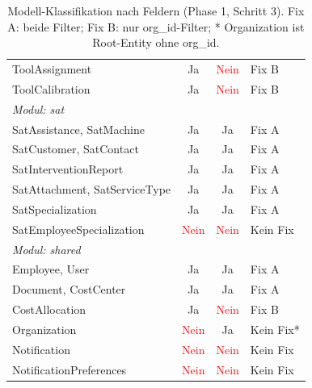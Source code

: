 \begin{table}[H]
\begin{center}
\begin{tabular}{|l|c|c|l|}
            ToolAssignment                & \textcolor{green!60!black}{Ja} & \textcolor{red}{Nein}          & Fix B              \\
            ToolCalibration               & \textcolor{green!60!black}{Ja} & \textcolor{red}{Nein}          & Fix B              \\
            \hline
            \multicolumn{4}{|l|}{\textit{Modul: sat}}                                                                            \\
            \hline
            SatAssistance, SatMachine     & \textcolor{green!60!black}{Ja} & \textcolor{green!60!black}{Ja} & Fix A              \\
            SatCustomer, SatContact       & \textcolor{green!60!black}{Ja} & \textcolor{green!60!black}{Ja} & Fix A              \\
            SatInterventionReport         & \textcolor{green!60!black}{Ja} & \textcolor{green!60!black}{Ja} & Fix A              \\
            SatAttachment, SatServiceType & \textcolor{green!60!black}{Ja} & \textcolor{green!60!black}{Ja} & Fix A              \\
            SatSpecialization             & \textcolor{green!60!black}{Ja} & \textcolor{green!60!black}{Ja} & Fix A              \\
            SatEmployeeSpecialization     & \textcolor{red}{Nein}          & \textcolor{red}{Nein}          & Kein Fix           \\
            \hline
            \multicolumn{4}{|l|}{\textit{Modul: shared}}                                                                         \\
            \hline
            Employee, User                & \textcolor{green!60!black}{Ja} & \textcolor{green!60!black}{Ja} & Fix A              \\
            Document, CostCenter          & \textcolor{green!60!black}{Ja} & \textcolor{green!60!black}{Ja} & Fix A              \\
            CostAllocation                & \textcolor{green!60!black}{Ja} & \textcolor{red}{Nein}          & Fix B              \\
            Organization                  & \textcolor{red}{Nein}          & \textcolor{green!60!black}{Ja} & Kein Fix*          \\
            Notification                  & \textcolor{red}{Nein}          & \textcolor{red}{Nein}          & Kein Fix           \\
            NotificationPreferences       & \textcolor{red}{Nein}          & \textcolor{red}{Nein}          & Kein Fix           \\
            \hline
        \end{tabular}
    \end{center}
    \caption{Modell-Klassifikation nach Feldern (Phase 1, Schritt 3). Fix A: beide Filter; Fix B: nur org\_id-Filter; * Organization ist Root-Entity ohne org\_id.}
    \label{tab:model_matrix}
\end{table}

